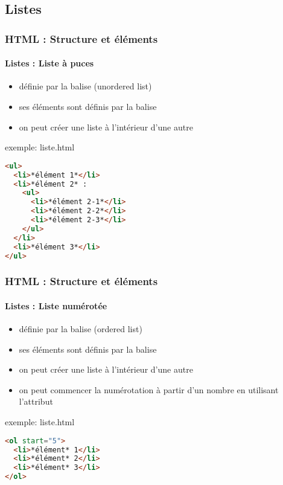 \documentclass[xcolor=table]{beamer}
\begin{document}
\subsection{Listes}

\begin{frame}[fragile]
\frametitle{HTML : Structure et éléments}
\framesubtitle{Listes : Liste à puces}

\begin{minipage}{0.60\textwidth} 
	\begin{itemize}
		\item définie par la balise  (unordered list)
		\item ses éléments sont définis par la balise 
		\item on peut créer une liste à l'intérieur d'une autre
	\end{itemize}
\end{minipage}
%
\begin{minipage}{0.38\textwidth}
\begin{exampleblock}{exemple: liste.html}
\lstset{escapeinside=**}
\scriptsize\bfseries
\begin{lstlisting}[language={html}]
<ul>
  <li>*élément 1*</li>
  <li>*élément 2* :
    <ul>
      <li>*élément 2-1*</li>
      <li>*élément 2-2*</li>
      <li>*élément 2-3*</li>
    </ul>
  </li>
  <li>*élément 3*</li>
</ul>
\end{lstlisting}
\end{exampleblock}
\end{minipage}

\end{frame}

\begin{frame}[fragile]
\frametitle{HTML : Structure et éléments}
\framesubtitle{Listes : Liste numérotée}

\begin{minipage}{0.60\textwidth} 
	\begin{itemize}
		\item définie par la balise  (ordered list)
		\item ses éléments sont définis par la balise 
		\item on peut créer une liste à l'intérieur d'une autre
		\item on peut commencer la numérotation à partir d'un nombre en utilisant l'attribut 
	\end{itemize}
\end{minipage}
%
\begin{minipage}{0.38\textwidth}
\begin{exampleblock}{exemple: liste.html}
\lstset{escapeinside=**}
\scriptsize\bfseries
\begin{lstlisting}[language={html}]
<ol start="5">
  <li>*élément* 1</li>
  <li>*élément* 2</li>
  <li>*élément* 3</li>
</ol>
\end{lstlisting}
\end{exampleblock}
\end{minipage}

\end{frame}
\end{document}
